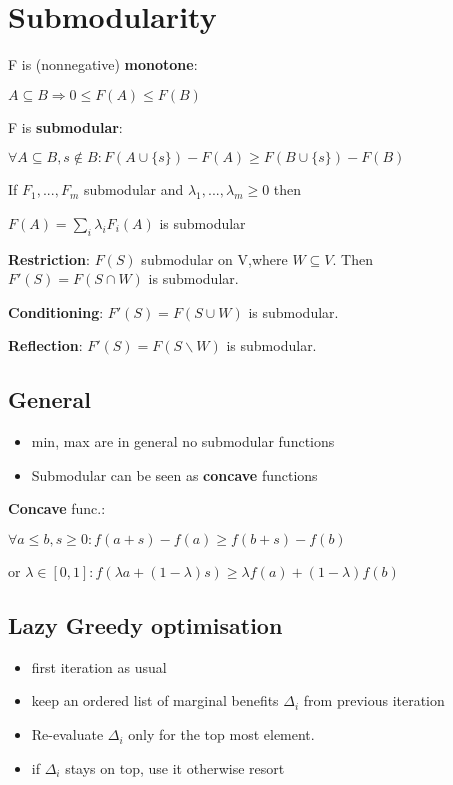 \documentclass[a4paper,11pt,twocolumn]{article}
\begin{document}
\section{Submodularity}

F is (nonnegative) \textbf{monotone}: 

$A \subseteq B \Rightarrow 0 \leq F(A)  \leq F(B)$


F is \textbf{submodular}: 

$\forall A \subseteq B, s \notin B:  F(A \cup \lbrace s  \rbrace) - F(A) \geq F(B \cup \lbrace s \rbrace ) - F(B)$



If $F_1,...,F_m$ submodular and $\lambda_1,...,\lambda_m \geq 0 $ then

$F(A) = \sum_i \lambda_i F_i(A)$ is submodular 

\textbf{Restriction}: $F(S)$ submodular on V,where $W \subseteq V$. Then $F'(S) = F(S \cap W)$ is submodular.

\textbf{Conditioning}: $F'(S) = F(S \cup W)$ is submodular.

\textbf{Reflection}: $F'(S) = F(S \backslash W)$ is submodular.

\subsection{General}
\begin{itemize}[noitemsep,topsep=0pt,parsep=0pt,partopsep=0pt]
\item min, max are in general no submodular functions
\item Submodular can be seen as \textbf{concave} functions
\end{itemize} 

\textbf{Concave} func.: 

$\forall a \leq b, s \geq 0 : f(a+s)- f(a) \geq f(b+s) -f(b)$

or $\lambda \in [0,1]: f(\lambda a+ (1-\lambda)s) \geq \lambda f(a) + (1-\lambda) f(b)$

\subsection{Lazy Greedy optimisation}
\begin{itemize}[noitemsep,topsep=0pt,parsep=0pt,partopsep=0pt]
\item first iteration as usual
\item keep an ordered list of marginal benefits $\Delta_i$ from previous iteration
\item 	Re-evaluate $\Delta_i$ only for the top most element.
\item if $\Delta_i$ stays on top, use it otherwise resort
\end{itemize}
\end{document}
